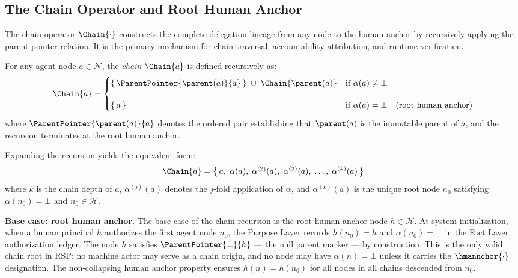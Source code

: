 \subsection{The Chain Operator and Root Human Anchor}
\label{sec:chain-definition}

The chain operator $\Chain{\cdot}$ constructs the complete delegation lineage from any node to the human anchor by recursively applying the parent pointer relation. It is the primary mechanism for chain traversal, accountability attribution, and runtime verification.

\begin{dfn}\label{def:chain-operator}
For any agent node $a \in \mathcal{N}$, the \emph{chain} $\Chain{a}$ is defined recursively as:
\begin{equation}
\Chain{a} =
\begin{cases}
\{\, \ParentPointer{\parent(a)}{a} \, \} \;\cup\; \Chain{\parent(a)} & \text{if } \alpha(a) \neq \bot \\[12pt]
\{\, a \,\} & \text{if } \alpha(a) = \bot \quad \text{(root human anchor)}
\end{cases}
\label{eq:chain-operator}
\end{equation}
where $\ParentPointer{\parent(a)}{a}$ denotes the ordered pair establishing that $\parent(a)$ is the immutable parent of $a$, and the recursion terminates at the root human anchor.
\end{dfn}

Expanding the recursion yields the equivalent form:
\begin{equation}
\Chain{a} = \bigl\{\, a,\; \alpha(a),\; \alpha^{(2)}(a),\; \alpha^{(3)}(a),\; \ldots,\; \alpha^{(k)}(a) \,\bigr\}
\label{eq:chain-expanded}
\end{equation}
where $k$ is the chain depth of $a$, $\alpha^{(j)}(a)$ denotes the $j$-fold application of $\alpha$, and $\alpha^{(k)}(a)$ is the unique root node $n_0$ satisfying $\alpha(n_0) = \bot$ and $n_0 \in \mathcal{H}$.

\medskip
\noindent\textbf{Base case: root human anchor.} The base case of the chain recursion is the root human anchor node $h \in \mathcal{H}$. At system initialization, when a human principal $h$ authorizes the first agent node $n_0$, the Purpose Layer records $h(n_0) = h$ and $\alpha(n_0) = \bot$ in the Fact Layer authorization ledger. The node $h$ satisfies $\ParentPointer{\bot}{h}$ — the null parent marker — by construction. This is the only valid chain root in RSP: no machine actor may serve as a chain origin, and no node may have $\alpha(n) = \bot$ unless it carries the $\hmannchor{\cdot}$ designation. The non-collapsing human anchor property ensures $h(n) = h(n_0)$ for all nodes in all chains descended from $n_0$.

